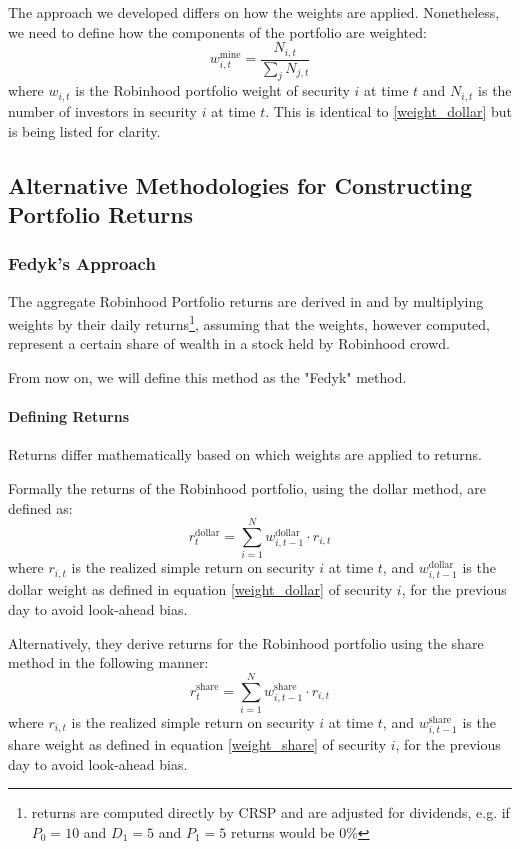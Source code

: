 The approach we developed differs on how the weights are applied. 
Nonetheless, we need to define how the components of the portfolio are weighted:
\begin{equation}
    w^{\text{mine}}_{i,t} = \frac{N_{i,t}}{\sum_j N_{j,t}}
    \label{weight_mine}
\end{equation}
where $w_{i,t}$ is the Robinhood portfolio weight of security $i$ at time $t$ and $N_{i,t}$ is the number of investors in security $i$ at time $t$.
This is identical to \ref{weight_dollar} but is being listed for clarity. 


\subsection{Alternative Methodologies for Constructing Portfolio Returns}

\subsubsection{Fedyk's Approach}
The aggregate Robinhood Portfolio returns are derived in \cite{Fedyk2024} and \cite{Welch2022} by multiplying weights by their daily returns\footnote{
    returns are computed directly by CRSP and are adjusted for dividends, e.g. if $P_0=10$ and $D_1=5$ and $P_1=5$ returns would be 0\%}, 
assuming that the weights, however computed, represent a certain share of wealth in a stock held by Robinhood crowd.

From now on, we will define this method as the "Fedyk" method.

\paragraph{Defining Returns}
Returns differ mathematically based on which weights are applied to returns.

Formally the returns of the Robinhood portfolio, using the dollar method, are defined as:
\begin{equation}
    r^{\text{dollar}}_t = \sum_{i=1}^N w^{\text{dollar}}_{i,t-1}\cdot r_{i,t}
    \label{returns_fedyk_dollar}
\end{equation}
where $r_{i,t}$ is the realized simple return on security $i$ at time $t$, and $w^{\text{dollar}}_{i,t-1}$ is the dollar weight as defined in equation \ref{weight_dollar} of security $i$, for the previous day to avoid look-ahead bias.

Alternatively, they derive returns for the Robinhood portfolio using the share method in the following manner:
\begin{equation}
    r^{\text{share}}_t = \sum_{i=1}^N w^{\text{share}}_{i,t-1}\cdot r_{i,t}
    \label{returns_fedyk_share}
\end{equation}
where $r_{i,t}$ is the realized simple return on security $i$ at time $t$, and $w^{\text{share}}_{i,t-1}$ is the share weight as defined in equation \ref{weight_share} of security $i$, for the previous day to avoid look-ahead bias.

